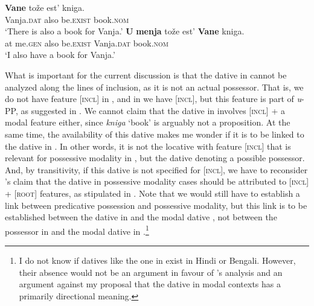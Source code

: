 \documentclass[output=paper,colorlinks,citecolor=brown,modfonts,nonflat]{langsci/langscibook}
\begin{document}
\ea%
    \label{ex:tsedryk:13}
    \ea\label{ex:tsedryk:13a}
    \gll    \textbf{Vane}         {tože}    {est’}           {kniga.}\\
            Vanja.\textsc{dat}   also   be.\textsc{exist}   book.\textsc{nom}\\
    \glt    ‘There is also a book for Vanja.’
    \ex\label{ex:tsedryk:13b}
    \gll    \textbf{U} \textbf{menja}     {tože}   {est’}           \textbf{{Vane}}         {kniga.}\\
            at me.\textsc{gen}    also   be.\textsc{exist}   Vanja.\textsc{dat}   book.\textsc{nom}\\
    \glt    ‘I also have a book for Vanja.’
    \z
\z


\largerpage
What is important for the current discussion is that the dative in  cannot be analyzed along the lines of inclusion, as it is not an actual possessor. That is, we do not have feature [\textsc{incl}] in , and in  we have [\textsc{incl}], but this feature is part of \textit{u}{}-PP, as suggested in . We cannot claim that the dative in  involves [\textsc{incl}] + a modal feature either, since \textit{kniga} ‘book’ is arguably not a proposition. At the same time, the availability of this dative makes me wonder if it is to be linked to the dative in . In other words, it is not the locative with feature [\textsc{incl}] that is relevant for possessive modality in , but the dative denoting a possible possessor. And, by transitivity, if this dative is not specified for [\textsc{incl}], we have to reconsider \citeauthor{BjorkmanCowper2016}’s claim that the dative in possessive modality cases should be attributed to [\textsc{incl}] + [\textsc{root}] features, as stipulated in . Note that we would still have to establish a link between predicative possession and possessive modality, but this link is to be established between the dative in  and the modal dative , not between the possessor in  and the modal dative in .\footnote{I do not know if datives like the one in  exist in Hindi or Bengali. However, their absence would not be an argument in favour of \citeauthor{BjorkmanCowper2016}’s analysis and an argument against my proposal that the dative in modal contexts has a primarily directional meaning.}
\end{document}
